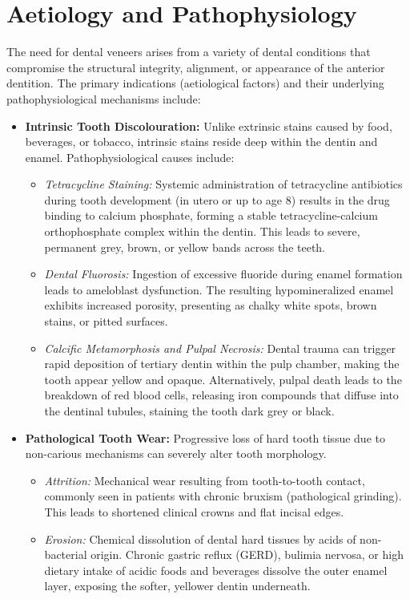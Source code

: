\section*{Aetiology and Pathophysiology}
The need for dental veneers arises from a variety of dental conditions that compromise the structural integrity, alignment, or appearance of the anterior dentition. The primary indications (aetiological factors) and their underlying pathophysiological mechanisms include:
\begin{itemize}
    \item \textbf{Intrinsic Tooth Discolouration:} Unlike extrinsic stains caused by food, beverages, or tobacco, intrinsic stains reside deep within the dentin and enamel. Pathophysiological causes include:
    \begin{itemize}
        \item \textit{Tetracycline Staining:} Systemic administration of tetracycline antibiotics during tooth development (in utero or up to age 8) results in the drug binding to calcium phosphate, forming a stable tetracycline-calcium orthophosphate complex within the dentin. This leads to severe, permanent grey, brown, or yellow bands across the teeth.
        \item \textit{Dental Fluorosis:} Ingestion of excessive fluoride during enamel formation leads to ameloblast dysfunction. The resulting hypomineralized enamel exhibits increased porosity, presenting as chalky white spots, brown stains, or pitted surfaces.
        \item \textit{Calcific Metamorphosis and Pulpal Necrosis:} Dental trauma can trigger rapid deposition of tertiary dentin within the pulp chamber, making the tooth appear yellow and opaque. Alternatively, pulpal death leads to the breakdown of red blood cells, releasing iron compounds that diffuse into the dentinal tubules, staining the tooth dark grey or black.
    \end{itemize}
    \item \textbf{Pathological Tooth Wear:} Progressive loss of hard tooth tissue due to non-carious mechanisms can severely alter tooth morphology.
    \begin{itemize}
        \item \textit{Attrition:} Mechanical wear resulting from tooth-to-tooth contact, commonly seen in patients with chronic bruxism (pathological grinding). This leads to shortened clinical crowns and flat incisal edges.
        \item \textit{Erosion:} Chemical dissolution of dental hard tissues by acids of non-bacterial origin. Chronic gastric reflux (GERD), bulimia nervosa, or high dietary intake of acidic foods and beverages dissolve the outer enamel layer, exposing the softer, yellower dentin underneath.

\end{itemize}
\end{itemize}
